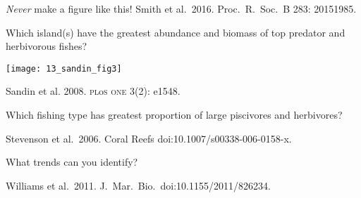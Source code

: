 \documentclass[t]{beamer}
\begin{document}
%
{
\begin{frame}[b]

	\tiny \emph{Never} make a figure like this! \hfill Smith et al.~2016. Proc.~R.~Soc.~B 283: 20151985.

\end{frame}
}
%
\begin{frame}[t]{Which island(s) have the greatest abundance and biomass of top predator and herbivorous fishes?}

	\texttt{[image: 13\_sandin\_fig3]}

	\vfilll
	
	\hfill \tiny Sandin et al. 2008. \textsc{pl}o\textsc{s one} 3(2): e1548.

\end{frame}
%
{
\begin{frame}[b]{Which fishing type has greatest proportion of large piscivores and herbivores?}

	\tiny \hfill Stevenson et al.~2006. Coral Reefs doi:10.1007/s00338-006-0158-x.

\end{frame}
}
%
%
{
\begin{frame}[b]{What trends can you identify?}

	\tiny \hfill Williams et al.~2011. J.~Mar.~Bio.~doi:10.1155/2011/826234.

\end{frame}
}
%

%
%
%
%	
%
%


%
%
%
%
%
%
%
%
\end{document}
